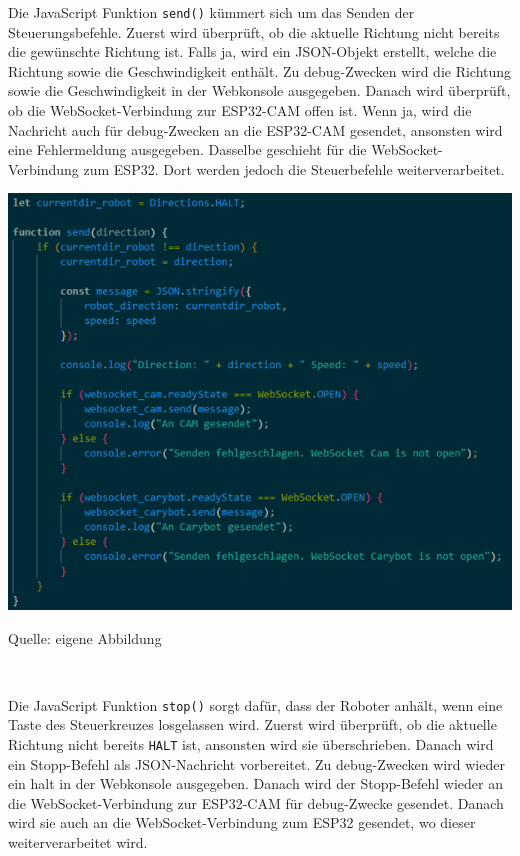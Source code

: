 \documentclass[ngerman,12pt,a4paper]{article}
\begin{document}
	Die JavaScript Funktion \texttt{send()} kümmert sich um das Senden der Steuerungsbefehle. Zuerst wird überprüft, ob die aktuelle Richtung nicht bereits die gewünschte Richtung ist. Falls ja, wird ein JSON-Objekt erstellt, welche die Richtung sowie die Geschwindigkeit enthält. Zu debug-Zwecken wird die Richtung sowie die Geschwindigkeit in der Webkonsole ausgegeben. Danach wird überprüft, ob die WebSocket-Verbindung zur ESP32-CAM offen ist. Wenn ja, wird die Nachricht auch für debug-Zwecken an die ESP32-CAM gesendet, ansonsten wird eine Fehlermeldung ausgegeben. Dasselbe geschieht für die WebSocket-Verbindung zum ESP32. Dort werden jedoch die Steuerbefehle weiterverarbeitet. \\
	\begin{center}
		\begin{minipage}[t]{0.75\textwidth}
			\includegraphics[scale=0.7]{Pictures/Steuerung-js3}
			\label{fig:Steuerkreuz-js3}
			\vspace{-10pt}
			\begin{center}
				\par\small Quelle: eigene Abbildung 
			\end{center}
		\end{minipage} \\[0.75cm]
	\end{center}
	Die JavaScript Funktion \texttt{stop()} sorgt dafür, dass der Roboter anhält, wenn eine Taste des Steuerkreuzes losgelassen wird. Zuerst wird überprüft, ob die aktuelle Richtung nicht bereits \texttt{HALT} ist, ansonsten wird sie überschrieben. Danach wird ein Stopp-Befehl als JSON-Nachricht vorbereitet. Zu debug-Zwecken wird wieder ein halt in der Webkonsole ausgegeben. Danach wird der Stopp-Befehl wieder an die WebSocket-Verbindung zur ESP32-CAM für debug-Zwecke gesendet. Danach wird sie auch an die WebSocket-Verbindung zum ESP32 gesendet, wo dieser weiterverarbeitet wird. \\[0.5cm]
\end{document}
